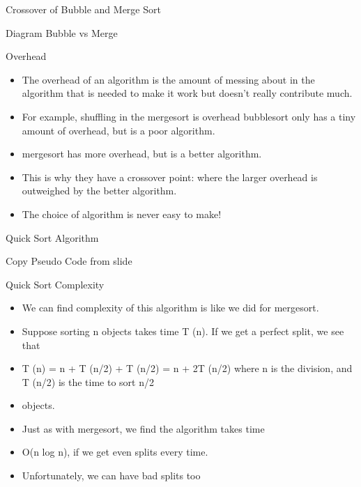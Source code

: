\documentclass{beamer}
\begin{document}
\begin{frame}
\end{frame} \begin{frame}

Crossover of Bubble and Merge Sort

Diagram Bubble vs Merge

\end{frame} \begin{frame}

Overhead

\begin{itemize}
\item The overhead of an algorithm is the amount of messing about in the algorithm that is needed to make it work but
doesn't really contribute much.
\item For example, shuffling in the mergesort is overhead bubblesort only has a tiny amount of overhead, but is a poor
algorithm.
\item mergesort has more overhead, but is a better algorithm.
\item This is why they have a crossover point: where the larger overhead is outweighed by the better algorithm.
\item The choice of algorithm is never easy to make!
\end{itemize}

\end{frame} \begin{frame}

Quick Sort Algorithm

Copy Pseudo Code from slide

\end{frame} \begin{frame}

Quick Sort Complexity

\begin{itemize}
\item We can find complexity of this algorithm is like we did for mergesort.
\item Suppose sorting n objects takes time T (n). If we get a perfect split, we see that
\item T (n) = n + T (n/2) + T (n/2) = n + 2T (n/2) where n is the division, and T (n/2) is the time to sort n/2
\item objects.
\item Just as with mergesort, we find the algorithm takes time
\item O(n log n), if we get even splits every time.
\item Unfortunately, we can have bad splits too
\end{itemize}


\end{frame}
\end{document}
